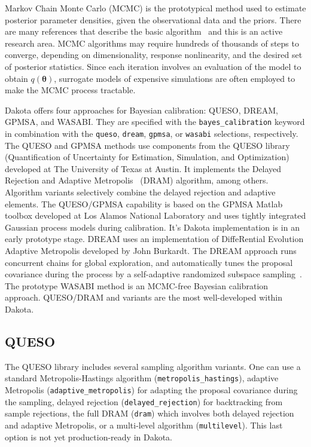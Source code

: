 Markov Chain Monte Carlo (MCMC) is the prototypical method used to
estimate posterior parameter densities, given the observational data
and the priors. There are many references that describe the basic
algorithm~\cite{Gilks} and this is an active research area.  MCMC
algorithms may require hundreds of thousands of steps to converge,
depending on dimensionality, response nonlinearity, and the desired
set of posterior statistics.  Since each iteration involves an
evaluation of the model to obtain $q(\boldsymbol{\theta})$, surrogate
models of expensive simulations are often employed to make the MCMC
process tractable.
 
Dakota offers four approaches for Bayesian calibration: QUESO, DREAM,
GPMSA, and WASABI.  They are specified with the
\texttt{bayes\_calibration} keyword in combination with the
\texttt{queso}, \texttt{dream}, \texttt{gpmsa}, or \texttt{wasabi}
selections, respectively.  The QUESO and GPMSA methods use components
from the QUESO library (Quantification of Uncertainty for Estimation,
Simulation, and Optimization) developed at The University of Texas at
Austin.  It implements the Delayed Rejection and Adaptive
Metropolis~\cite{Haario} (DRAM) algorithm, among others.  Algorithm
variants selectively combine the delayed rejection and adaptive
elements.  The QUESO/GPMSA capability is based on the GPMSA Matlab
toolbox developed at Los Alamos National Laboratory and uses tightly
integrated Gaussian process models during calibration.  It's Dakota
implementation is in an early prototype stage.  DREAM uses an
implementation of DiffeRential Evolution Adaptive Metropolis developed
by John Burkardt.  The DREAM approach runs concurrent chains for
global exploration, and automatically tunes the proposal covariance
during the process by a self-adaptive randomized subspace
sampling~\cite{Vrugt}.  The prototype WASABI method is an MCMC-free
Bayesian calibration approach.  QUESO/DRAM
and variants are the most well-developed within Dakota.

\subsection{QUESO}\label{uq:bayesian:queso}
The QUESO library includes several sampling algorithm variants.  One
can use a standard Metropolis-Hastings algorithm
(\texttt{metropolis\_hastings}), adaptive Metropolis
(\texttt{adaptive\_metropolis}) for adapting the proposal covariance
during the sampling, delayed rejection (\texttt{delayed\_rejection})
for backtracking from sample rejections, the full DRAM (\texttt{dram})
which involves both delayed rejection and adaptive Metropolis, or a
multi-level algorithm (\texttt{multilevel}).  This last option is not
yet production-ready in Dakota. 

